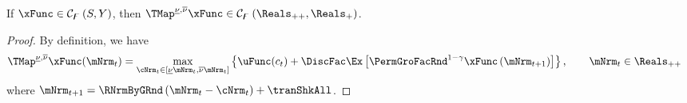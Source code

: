 \documentclass[\econtexRoot/BufferStockTheory]{subfiles}
\begin{document}
\begin{claim}\label{clm:hiraguchi_cont}
If $\xFunc\in  \mathcal{C}_{\boundFunc }\left( S,Y\right)$, then $\TMap^{\MPCminInf, \MPCmaxInf}{\mathfrak{\xFunc}}\in \mathcal{C}_{\boundFunc }\left(\Reals_{++}, \Reals_{+}\right)$. 
\end{claim}
%
\begin{proof}
By definition, we have
%
\begin{equation}\begin{gathered}\begin{aligned}
  \TMap^{\MPCminInf, \MPCmaxInf}{\mathfrak{\xFunc}}(\mNrm_{t}) & = \underset{\cNrm_{t} \in
                                            [\MPCminInf \mNrm_{t}, \MPCmaxInf \mNrm_{t}]
                                            }\max \left\{
                                            \uFunc(c_{t})+\DiscFac \Ex\left[ {\PermGroFacRnd}^{1-\CRRA }{\mathfrak{\xFunc}}
                                            \left( {\mNrm}_{t+1}\right) \right] \right\}, \qquad \mNrm_{t}\in \Reals_{++}  %
\end{aligned}\end{gathered}\end{equation}
%
where ${\mNrm}_{t+1} = \RNrmByGRnd\left(\mNrm_{t} - \cNrm_{t}\right) + \tranShkAll$.


\end{proof}
\end{document}
